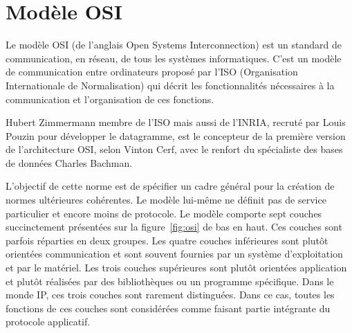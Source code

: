 \documentclass[12pt]{report}
\begin{document}

\section{Modèle OSI}

Le modèle OSI (de l'anglais Open Systems Interconnection) est un standard de communication, en réseau, de tous les systèmes informatiques. C'est un modèle de communication entre ordinateurs proposé par l'ISO (Organisation Internationale de Normalisation) qui décrit les fonctionnalités nécessaires à la communication et l'organisation de ces fonctions.

Hubert Zimmermann membre de l'ISO mais aussi de l'INRIA, recruté par Louis Pouzin pour développer le datagramme, est le concepteur de la première version de l’architecture OSI, selon Vinton Cerf, avec le renfort du spécialiste des bases de données Charles Bachman.

L'objectif de cette norme est de spécifier un cadre général pour la création de normes ultérieures cohérentes. Le modèle lui-même ne définit pas de service particulier et encore moins de protocole.
Le modèle comporte sept couches succinctement présentées sur la figure~\ref{fig:osi} de bas en haut. Ces couches sont parfois réparties en deux groupes.
Les quatre couches inférieures sont plutôt orientées communication et sont souvent fournies par un système d'exploitation et par le matériel.
Les trois couches supérieures sont plutôt orientées application et plutôt réalisées par des bibliothèques ou un programme spécifique. Dans le monde IP, ces trois couches sont rarement distinguées. Dans ce cas, toutes les fonctions de ces couches sont considérées comme faisant partie intégrante du protocole applicatif\cite{wikiosi}.
\end{document}
